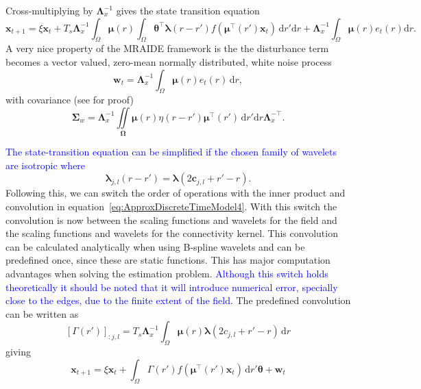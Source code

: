 \documentclass[review,authoryear,3p]{elsarticle}
\newcommand{\parham}[1]{\textcolor{blue}{#1}}
\begin{document}
Cross-multiplying by $\mathbf{\Lambda}_{x}^{-1}$ gives the state transition equation
\begin{equation}\label{eq:ApproxDiscreteTimeModel4}
	\mathbf{x}_{t+1} = 
	\xi \mathbf{x}_t + 
	T_s \mathbf{\Lambda}_{x}^{-1} \int_{\Omega}\boldsymbol\mu\left(r\right)\int_\Omega { 
	    \boldsymbol\theta^\top\boldsymbol\lambda\left(r-r'\right)
	    f\left(\boldsymbol\mu^\top\left(r'\right)\mathbf{x}_t\right) 
	\, \mathrm{d}r'\mathrm{d}r}  
	+ \mathbf{\Lambda}_{x}^{-1}\int_{\Omega}\boldsymbol{\mu}\left(r\right) e_t\left(r\right) \mathrm{d}r.
\end{equation}
A very nice property of the MRAIDE framework is the the disturbance term becomes a vector valued, zero-mean normally distributed, white noise process 
\begin{equation}\label{eq:Disturbance}
\mathbf w_t= \mathbf{\Lambda}_{x}^{-1}\int_{\Omega}\boldsymbol\mu \left(r\right)e_t\left(r\right)\,\mathrm{d}r,
\end{equation}
with covariance (see \citep{Freestone2011} for proof)
\begin{equation}\label{eq:CovMatrix}
\boldsymbol\Sigma_w =\mathbf{\Lambda}_{x}^{-1}\iint\limits_{\boldsymbol\Omega}\boldsymbol\mu\left(r\right) \eta\left(r-r'\right)\boldsymbol\mu^{\top}\left(r'\right)\,\mathrm{d}r'\mathrm{d}r\mathbf{\Lambda}_{x}^{-\top}.
\end{equation} 

\parham{The state-transition equation can be simplified if the chosen family of wavelets are isotropic where}
\begin{equation}
	\boldsymbol{\lambda}_{j,l}(r-r') = \boldsymbol{\lambda}(2\mathbf{c}_{j,l}+r'-r). 
\end{equation}
Following this, we can switch the order of operations with the inner product and convolution in equation~\eqref{eq:ApproxDiscreteTimeModel4}. With this switch the convolution is now between the scaling functions and wavelets for the field and the scaling functions and wavelets for the connectivity kernel. This convolution can be calculated analytically when using B-spline wavelets and can be predefined once, since these are static functions. This has major computation advantages when solving the estimation problem. \parham{Although this switch holds theoretically it should be noted that it will introduce numerical error, specially close to the edges, due to the finite extent of the field. } The predefined convolution can be written as
\begin{equation}
	\left[\Gamma(r')\right]_{:j,l} = T_s \mathbf{\Lambda}_{x}^{-1}\int_{\Omega} \boldsymbol\mu\left(r\right)\boldsymbol\lambda\left(2c_{j,l} + r'-r\right) \,\mathrm{d}r
\end{equation}
giving
\begin{equation}
	\mathbf{x}_{t+1} = 
	\xi \mathbf{x}_t + 
	\int_{\Omega} \Gamma\left(r'\right)f\left(\boldsymbol\mu^\top\left(r'\right) \mathbf{x}_t\right) 
	\, \mathrm{d}r' \boldsymbol\theta
	+ \mathbf w_t
\end{equation}
\end{document}
